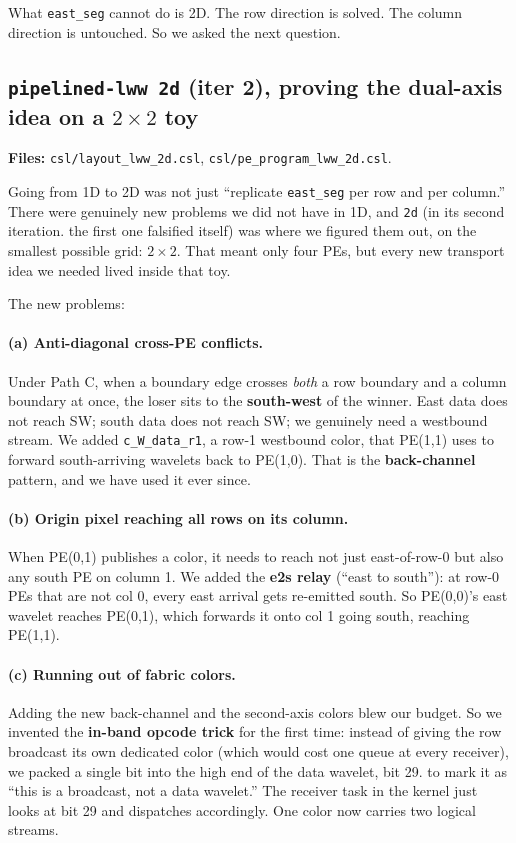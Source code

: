 \documentclass[11pt]{article}
\newcommand{\code}[1]{\texttt{#1}}
\newcommand{\file}[1]{\texttt{#1}}
\begin{document}
What \code{east\_seg} cannot do is 2D. The row direction is
solved. The column direction is untouched. So we asked the
next question.

\subsection{\code{pipelined-lww 2d} (iter 2), proving the dual-axis idea on a $2\times 2$ toy}
\textbf{Files:} \file{csl/layout\_lww\_2d.csl},
\file{csl/pe\_program\_lww\_2d.csl}.

Going from 1D to 2D was not just ``replicate \code{east\_seg}
per row and per column.'' There were genuinely new problems we
did not have in 1D, and \code{2d} (in its second iteration.
the first one falsified itself) was where we figured them out, on
the smallest possible grid: $2 \times 2$. That meant only four
PEs, but every new transport idea we needed lived inside that
toy.

The new problems:

\paragraph{(a) Anti-diagonal cross-PE conflicts.} Under Path C,
when a boundary edge crosses \emph{both} a row boundary and a
column boundary at once, the loser sits to the
\textbf{south-west} of the winner. East data does not reach SW;
south data does not reach SW; we genuinely need a westbound
stream. We added \code{c\_W\_data\_r1}, a row-1 westbound color,
that PE(1,1) uses to forward south-arriving wavelets back to
PE(1,0). That is the \textbf{back-channel} pattern, and we have
used it ever since.

\paragraph{(b) Origin pixel reaching all rows on its column.}
When PE(0,1) publishes a color, it needs to reach not just
east-of-row-0 but also any south PE on column 1. We added the
\textbf{e2s relay} (``east to south''): at row-0 PEs that are
not col 0, every east arrival gets re-emitted south. So
PE(0,0)'s east wavelet reaches PE(0,1), which forwards it onto
col 1 going south, reaching PE(1,1).

\paragraph{(c) Running out of fabric colors.} Adding the new
back-channel and the second-axis colors blew our budget. So we
invented the \textbf{in-band opcode trick} for the first time:
instead of giving the row broadcast its own dedicated color
(which would cost one queue at every receiver), we packed a
single bit into the high end of the data wavelet, bit 29.
to mark it as ``this is a broadcast, not a data wavelet.'' The
receiver task in the kernel just looks at bit 29 and dispatches
accordingly. One color now carries two logical streams.
\end{document}
